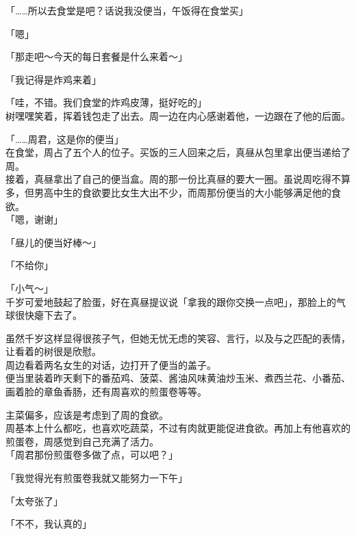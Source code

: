 「……所以去食堂是吧？话说我没便当，午饭得在食堂买」

「嗯」

「那走吧～今天的每日套餐是什么来着～」

「我记得是炸鸡来着」

「哇，不错。我们食堂的炸鸡皮薄，挺好吃的」\\

树嘿嘿笑着，挥着钱包走了出去。周一边在内心感谢着他，一边跟在了他的后面。\\

\vspace{2\baselineskip}

「……周君，这是你的便当」\\

在食堂，周占了五个人的位子。买饭的三人回来之后，真昼从包里拿出便当递给了周。\\

接着，真昼拿出了自己的便当盒。周的那一份比真昼的要大一圈。虽说周吃得不算多，但男高中生的食欲要比女生大出不少，而周那份便当的大小能够满足他的食欲。\\

「嗯，谢谢」

「昼儿的便当好棒～」

「不给你」

「小气～」\\

千岁可爱地鼓起了脸蛋，好在真昼提议说「拿我的跟你交换一点吧」，那脸上的气球很快瘪下去了。

虽然千岁这样显得很孩子气，但她无忧无虑的笑容、言行，以及与之匹配的表情，让看着的树很是欣慰。\\

周边看着两名女生的对话，边打开了便当的盖子。\\

便当里装着昨天剩下的番茄鸡、菠菜、酱油风味黄油炒玉米、煮西兰花、小番茄、画着脸的章鱼香肠，还有周喜欢的煎蛋卷等等。

主菜偏多，应该是考虑到了周的食欲。\\

周基本上什么都吃，也喜欢吃蔬菜，不过有肉就更能促进食欲。再加上有他喜欢的煎蛋卷，周感觉到自己充满了活力。\\

「周君那份煎蛋卷多做了点，可以吧？」

「我觉得光有煎蛋卷我就又能努力一下午」

「太夸张了」

「不不，我认真的」\\

